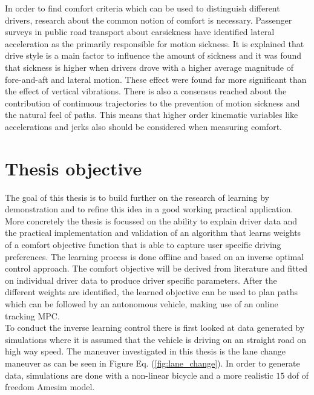 In order to find comfort criteria which can be used to distinguish different drivers, research about the common notion of comfort is necessary. Passenger surveys in public road transport about carsickness \cite{Turner1999} have identified lateral acceleration as the primarily responsible for motion sickness. It is explained that drive style is a main factor to influence the amount of sickness and it was found that sickness is higher when drivers drove with a higher average magnitude of fore-and-aft and lateral motion. These effect were found far more significant than the effect of vertical vibrations. There is also a consensus reached about the contribution of continuous trajectories to the prevention of motion sickness and the natural feel of paths.\cite{Elbanhawi2015} This means that higher order kinematic variables like accelerations and jerks also should be considered when measuring comfort.\\

\section{Thesis objective}
The goal of this thesis is to build further on the research of learning by demonstration \cite{Kuderer2015a} and to refine this idea in a good working practical application. More concretely the thesis is focussed on the ability to explain driver data and the practical implementation and validation of an algorithm that learns weights of a comfort objective function that is able to capture user specific driving preferences. The learning process is done offline and based on an inverse optimal control approach. The comfort objective will be derived from literature and fitted on individual driver data to produce driver specific parameters. After the different weights are identified, the learned objective can be used to plan paths which can be followed by an autonomous vehicle, making use of an online tracking MPC.\\


To conduct the inverse learning control there is first looked at data generated by simulations where it is assumed that the vehicle is driving on an straight road on high way speed. The maneuver investigated in this thesis is the lane change maneuver as can be seen in Figure Eq. (\ref{fig:lane_change}). In order to generate data, simulations are done with a non-linear bicycle and a more realistic $15$ dof of freedom Amesim model.


